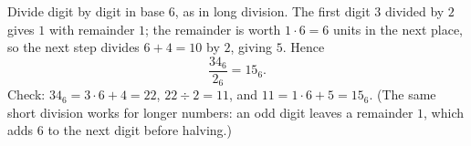 Divide digit by digit in base $6$, as in long division. The first digit $3$ divided by $2$ gives $1$ with remainder $1$; the remainder is worth $1\cdot6=6$ units in the next place, so the next step divides $6+4=10$ by $2$, giving $5$. Hence
\[
\dfrac{34_6}{2_6}=\boxed{15_6}.
\]
Check: $34_6=3\cdot6+4=22$, $22\div2=11$, and $11=1\cdot6+5=15_6$. (The same short division works for longer numbers: an odd digit leaves a remainder $1$, which adds $6$ to the next digit before halving.)
